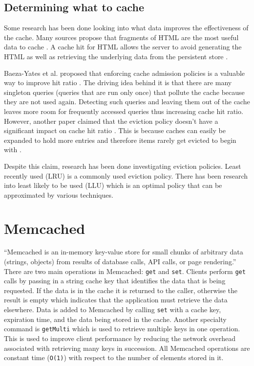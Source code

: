 \documentclass[12pt]{ucthesis}
\begin{document}
\subsection{Determining what to cache}
Some research has been done looking into what data improves the effectiveness of the cache.
Many sources propose that fragments of HTML are the most useful data to cache \cite{comparisonOfCachingSolutions, scalableConsistentCaching}.
A cache hit for HTML allows the server to avoid generating the HTML as well as retrieving the underlying data from the persistent store \cite{howBasecampGotSoFast}.

Baeza-Yates et al. proposed that enforcing cache admission policies is a valuable way to improve hit ratio \cite{cacheAdmissionPolicies}.
The driving idea behind it is that there are many singleton queries (queries that are run only once) that pollute the cache because they are not used again.
Detecting such queries and leaving them out of the cache leaves more room for frequently accessed queries thus increasing cache hit ratio.
However, another paper claimed that the eviction policy doesn't have a significant impact on cache hit ratio \cite{refreshingPerspectiveSearch}.
This is because caches can easily be expanded to hold more entries and therefore items rarely get evicted to begin with \cite{refreshingPerspectiveSearch}.

Despite this claim, research has been done investigating eviction policies.
Least recently used (LRU) is a commonly used eviction policy.
There has been research into least likely to be used (LLU) which is an optimal policy that can be approximated by various techniques.


\section{Memcached}
``Memcached is an in-memory key-value store for small chunks of arbitrary data (strings, objects) from results of database calls, API calls, or page rendering.''\cite{memcachedDotOrg}
There are two main operations in {\textsf Memcached}: {\tt get} and {\tt set}.
Clients perform {\tt get} calls by passing in a string cache key that identifies the data that is being requested.
If the data is in the cache it is returned to the caller, otherwise the result is empty which indicates that the application must retrieve the data elsewhere.
Data is added to {\textsf Memcached} by calling {\tt set} with a cache key, expiration time, and the data being stored in the cache.
Another specialty command is {\tt getMulti} which is used to retrieve multiple keys in one operation.
This is used to improve client performance by reducing the network overhead associated with retrieving many keys in succession.
All {\textsf Memcached} operations are constant time ({\tt O(1)}) with respect to the number of elements stored in it.
\end{document}
